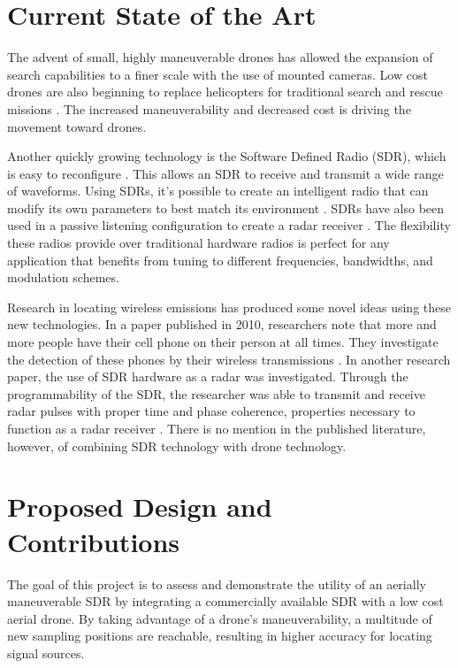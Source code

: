 \section{Current State of the Art}
The advent of small, highly maneuverable drones has allowed the expansion of search capabilities to a finer scale with the use of mounted cameras. Low cost drones are also beginning to replace helicopters for traditional search and rescue missions \cite{drone_replacement}. The increased maneuverability and decreased cost is driving the movement toward drones.\par
Another quickly growing technology is the Software Defined Radio (SDR), which is easy to reconfigure \cite{int_radio}. This allows an SDR to receive and transmit a wide range of waveforms. Using SDRs, it’s possible to create an intelligent radio that can modify its own parameters to best match its environment \cite{int_radio}. SDRs have also been used in a passive listening configuration to create a radar receiver \cite{radar_conf}. The flexibility these radios provide over traditional hardware radios is perfect for any application that benefits from tuning to different frequencies, bandwidths, and modulation schemes.\par
Research in locating wireless emissions has produced some novel ideas using these new technologies. In a paper published in 2010, researchers note that more and more people have their cell phone on their person at all times. They investigate the detection of these phones by their wireless transmissions \cite{novel_localization}. In another research paper, the use of SDR hardware as a radar was investigated. Through the programmability of the SDR, the researcher was able to transmit and receive radar pulses with proper time and phase coherence, properties necessary to function as a radar receiver \cite{GNR_sdr}. There is no mention in the published literature, however, of combining SDR technology with drone technology.\par
\section{Proposed Design and Contributions}
The goal of this project is to assess and demonstrate the utility of an aerially maneuverable SDR by integrating a commercially available SDR with a low cost aerial drone. By taking advantage of a drone's maneuverability, a multitude of new sampling positions are reachable, resulting in higher accuracy for locating signal sources.\par

